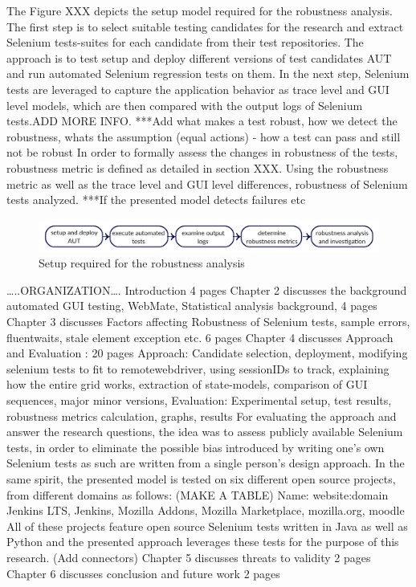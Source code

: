 The Figure XXX depicts the setup model required for the robustness analysis. The first step is to select suitable testing candidates for the research and extract Selenium tests-suites for each candidate from their test repositories. The approach is to test setup and deploy different versions of test candidates AUT and run automated Selenium regression tests on them.
In the next step, Selenium tests are leveraged to capture the application behavior as trace level and GUI level models, which are then compared with the output logs of Selenium tests.ADD MORE INFO.
***Add what makes a test robust, how we detect the robustness, whats the assumption (equal actions) - how a test can pass and still not be robust
In order to formally assess the changes in robustness of the tests, robustness metric is defined as detailed in section XXX. Using the robustness metric as well as the trace level and GUI level differences, robustness of Selenium tests analyzed.
***If the presented model detects failures etc
\begin{figure}
	\centering	\includegraphics[width=\textwidth]{./Figures/thesisoverviewsmall.jpg}
	\caption{Setup required for the robustness analysis}
	\label{fig:thesisoverview}
\end{figure} 

…..ORGANIZATION….
Introduction 4 pages
Chapter 2 discusses the background automated GUI testing, WebMate, Statistical analysis background, 4 pages
Chapter 3 discusses Factors affecting Robustness of Selenium tests, sample errors, fluentwaits, stale element exception etc. 6 pages
Chapter 4 discusses Approach and Evaluation : 20 pages
Approach: Candidate selection, deployment, modifying selenium tests to fit to remotewebdriver, using sessionIDs to track, explaining how the entire grid works, extraction of state-models, comparison of GUI sequences, major minor versions,
Evaluation: Experimental setup, test results, robustness metrics calculation, graphs, results
For evaluating the approach and answer the research questions, the idea was to assess publicly available Selenium tests, in order to eliminate the possible bias introduced by writing one’s own Selenium tests as such are written from a single person’s design approach. In the same spirit, the presented model is tested on six different open source projects, from different domains as follows: (MAKE A TABLE)
Name: website:domain
Jenkins LTS, Jenkins, Mozilla Addons, Mozilla Marketplace, mozilla.org, moodle
All of these projects feature open source Selenium tests written in Java as well as Python and the presented approach leverages these tests for the purpose of this research. (Add connectors)
Chapter 5 discusses threats to validity 2 pages
Chapter 6 discusses conclusion and future work 2 pages
 

